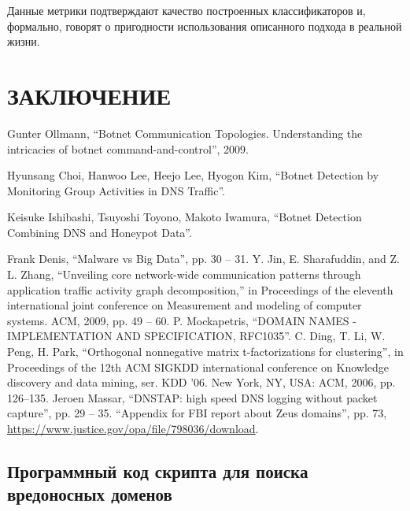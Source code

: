 \documentclass[a4paper,14pt]{extreport} %
\begin{document}
Данные метрики подтверждают качество построенных классификаторов и, формально, говорят о пригодности использования описанного подхода в реальной жизни.

\chapter*{ЗАКЛЮЧЕНИЕ}

\begin{thebibliography}{99}

		
	 Gunter Ollmann, ``Botnet Communication Topologies. Understanding the intricacies of botnet command-and-control'', 2009.
		
	 Hyunsang Choi, Hanwoo Lee, Heejo Lee, Hyogon Kim, ``Botnet Detection by Monitoring Group Activities in
	DNS Traffic''.
		
	 Keisuke Ishibashi, Tsuyoshi Toyono, Makoto Iwamura, ``Botnet Detection Combining DNS and Honeypot Data''.
		
	 Frank Denis, ``Malware vs Big Data'', pp. 30 -- 31.
	 Y. Jin, E. Sharafuddin, and Z. L. Zhang, “Unveiling core network-wide communication patterns through application traffic activity graph decomposition,” in Proceedings of the eleventh international joint conference on Measurement and modeling of computer systems. ACM, 2009, pp. 49 -- 60.
	  P. Mockapetris, ``DOMAIN NAMES - IMPLEMENTATION AND SPECIFICATION, RFC1035''.
	 C. Ding, T. Li, W. Peng, H. Park, ``Orthogonal nonnegative matrix t-factorizations for clustering'', in Proceedings of the 12th ACM SIGKDD
	international conference on Knowledge discovery and data mining, ser.
	KDD ’06. New York, NY, USA: ACM, 2006, pp. 126–135.
	 Jeroen Massar, ``DNSTAP: high speed DNS logging without packet capture'', pp. 29 -- 35.
	 ``Appendix for FBI report about Zeus domains'', pp. 73, \url{https://www.justice.gov/opa/file/798036/download}.
\end{thebibliography}

\begin{appendices}
	\renewcommand\chaptername{ПРИЛОЖЕНИЕ}
	\chapter{Программный код скрипта для поиска вредоносных доменов}
	\label{appendix:code}
	
\end{appendices}
\end{document}
